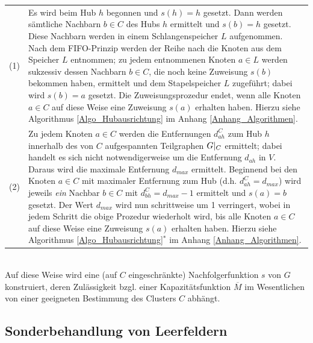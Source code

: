 \documentclass[fontsize=12pt,doubleside,openany,listof=totoc,listof=flat,listof=nochaptergap,numbers=noenddot]{scrbook}
\theoremstyle{style}
\begin{document}
\begin{tabular}{lp{13cm}}
(1)&Es wird beim Hub $h$ begonnen und $s(h)=h$ gesetzt. Dann werden sämtliche Nachbarn $b \in C$ des Hubs $h$ ermittelt und $s(b) = h$ gesetzt. Diese Nachbarn werden in einem Schlangenspeicher $L$ aufgenommen. Nach dem FIFO-Prinzip werden der Reihe nach die Knoten aus dem Speicher $L$ entnommen; zu jedem entnommenen Knoten $a \in L$ werden sukzessiv dessen Nachbarn $b \in C$, die noch keine Zuweisung $s(b)$ bekommen haben, ermittelt und dem Stapelspeicher $L$ zugeführt; dabei wird $s(b)=a$ gesetzt. Die Zuweisungsprozedur endet, wenn alle Knoten $a \in C$ auf diese Weise eine Zuweisung $s(a)$ erhalten haben. Hierzu siehe Algorithmus \ref{Algo_Hubausrichtung} im Anhang \ref{Anhang_Algorithmen}.\\
(2)&Zu jedem Knoten $a \in C$ werden die Entfernungen $d^C_{ah}$ zum Hub $h$ innerhalb des von $C$ aufgespannten Teilgraphen $G\arrowvert_C$ ermittelt; dabei handelt es sich nicht notwendigerweise um die Entfernung $d_{ah}$ in $V$. Daraus wird die maximale Entfernung $d_{max}$ ermittelt. Beginnend bei den Knoten $a\in C$ mit maximaler Entfernung zum Hub (d.h. $d^C_{ah} = d_{max}$) wird jeweils \textit{ein} Nachbar $b \in C$ mit $d^C_{bh} = d_{max}-1$ ermittelt und $s(a)=b$ gesetzt. Der Wert $d_{max}$ wird nun schrittweise um 1 verringert, wobei in jedem Schritt die obige Prozedur wiederholt wird, bis alle Knoten $a \in C$ auf diese Weise eine Zuweisung $s(a)$ erhalten haben. Hierzu siehe Algorithmus \ref{Algo_Hubausrichtung}$^*$ im Anhang \ref{Anhang_Algorithmen}.
\end{tabular}

\phantom \\
\noindent Auf diese Weise wird eine (auf $C$ eingeschränkte) Nachfolgerfunktion $s$ von $G$ konstruiert, deren Zulässigkeit bzgl. einer Kapazitätsfunktion $\overline{M}$ im Wesentlichen von einer geeigneten Bestimmung des Clusters $C$ abhängt. 


\subsection{Sonderbehandlung von Leerfeldern}
\label{section_Leerfelder}
\end{document}
